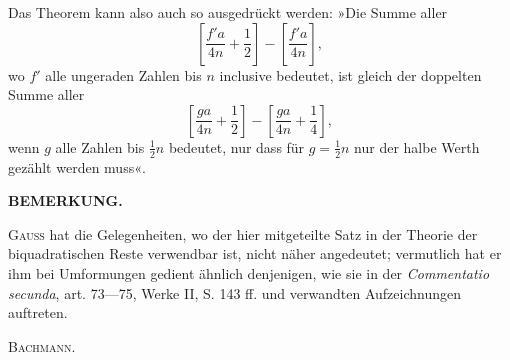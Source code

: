 Das Theorem kann also auch so ausgedrückt werden:\newline
»Die Summe aller
\[
\left[\frac{f'a}{4n}+\frac12\right]-\left[\frac{f'a}{4n}\right],
\]
\noindent wo $f'$ alle ungeraden Zahlen bis $n$ inclusive bedeutet, ist gleich der doppelten Summe aller
\[
\left[\frac{ga}{4n}+\frac12\right]-\left[\frac{ga}{4n}+\frac14\right],
\]
\noindent wenn $g$ alle Zahlen bis $\tfrac12n$ bedeutet, nur dass für $g=\tfrac12n$ nur der halbe Werth gezählt werden muss«.
\ClosingRule
\begin{center}\textbf{BEMERKUNG.}\end{center}
\begingroup\small
\par\indent\textsc{Gauss} hat die Gelegenheiten, wo der hier mitgeteilte Satz in der Theorie der biquadratischen Reste verwendbar ist, nicht näher angedeutet; vermutlich hat er ihm bei Umformungen gedient ähnlich denjenigen, wie sie in der \textit{Commentatio secunda}, art. 73—75, Werke II, S. 143 ff. und verwandten Aufzeichnungen auftreten.
\begin{flushright}\textsc{Bachmann.}\end{flushright}
\ClosingRule\clearpage\endgroup
